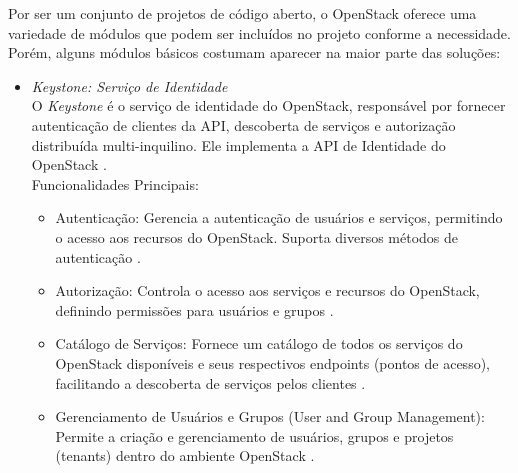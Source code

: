 \begin{itemize}
Por ser um conjunto de projetos de código aberto, o OpenStack oferece uma variedade de módulos que podem ser incluídos no projeto conforme a necessidade. Porém, alguns módulos básicos costumam aparecer na maior parte das soluções:

\begin{itemize}
    \item \emph{Keystone: Serviço de Identidade}\\
    O \textit{Keystone} é o serviço de identidade do OpenStack, responsável por fornecer autenticação de clientes da API, descoberta de serviços e autorização distribuída multi-inquilino. Ele implementa a API de Identidade do OpenStack \cite{openstack_keystone}.\\
    Funcionalidades Principais:
    \begin{itemize}
        \item Autenticação: Gerencia a autenticação de usuários e serviços, permitindo o acesso aos recursos do OpenStack. Suporta diversos métodos de autenticação \cite{openstack_keystone}.
        \item Autorização: Controla o acesso aos serviços e recursos do OpenStack, definindo permissões para usuários e grupos \cite{openstack_keystone}.
        \item Catálogo de Serviços: Fornece um catálogo de todos os serviços do OpenStack disponíveis e seus respectivos endpoints (pontos de acesso), facilitando a descoberta de serviços pelos clientes \cite{openstack_keystone}.
        \item Gerenciamento de Usuários e Grupos (User and Group Management): Permite a criação e gerenciamento de usuários, grupos e projetos (tenants) dentro do ambiente OpenStack \cite{openstack_keystone}.
    \end{itemize}


\end{itemize}
\end{itemize}

